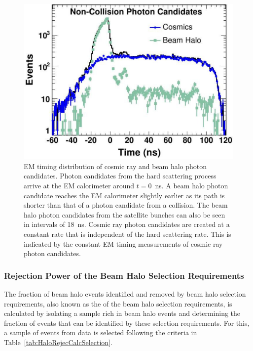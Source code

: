 \begin{figure}[p]
 \centering
 \includegraphics[scale=0.5]{./CosmicBeamHalo_EMtiming.pdf}
 \caption[EM timing distribution of photon candidates.]{EM timing distribution of cosmic ray and beam halo photon candidates. Photon candidates from the hard scattering process arrive at the EM calorimeter around $t=0$~ns. A beam halo photon candidate reaches the EM calorimeter slightly earlier as its path is shorter than that of a photon candidate from a collision. The beam halo photon candidates from the satellite bunches can also be seen in intervals of 18~ns. Cosmic ray photon candidates are created at a constant rate that is independent of the hard scattering rate. This is indicated by the constant EM timing measurements of cosmic ray photon candidates.}
 \label{fig:CosmicBeamHaloEMtiming}
\end{figure}

\subsubsection{Rejection Power of the Beam Halo Selection Requirements}
The fraction of beam halo events identified and removed by beam halo selection requirements, also known as the  of the beam halo selection requirements, is calculated by isolating a sample rich in beam halo events and determining the fraction of events that can be identified by these selection requirements. For this, a sample of events from data is selected following the criteria in Table~\ref{tab:HaloRejecCalcSelection}.


